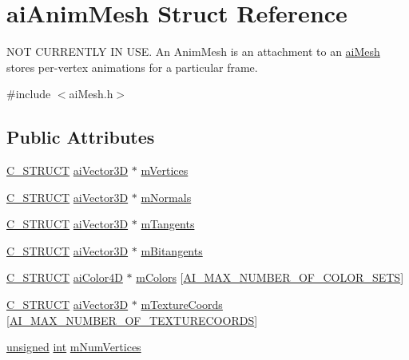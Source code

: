 \hypertarget{structai_anim_mesh}{\section{ai\-Anim\-Mesh Struct Reference}
\label{structai_anim_mesh}
}


N\-O\-T C\-U\-R\-R\-E\-N\-T\-L\-Y I\-N U\-S\-E. An Anim\-Mesh is an attachment to an \hyperlink{structai_mesh}{ai\-Mesh} stores per-\/vertex animations for a particular frame.  




{\ttfamily \#include $<$ai\-Mesh.\-h$>$}

\subsection*{Public Attributes}
\begin{DoxyCompactItemize}
\item 
\hyperlink{ai_defines_8h_ab51df4230ceb602bbc1bc109c432a6a0}{C\-\_\-\-S\-T\-R\-U\-C\-T} \hyperlink{structai_vector3_d}{ai\-Vector3\-D} $\ast$ \hyperlink{structai_anim_mesh_a0ac2dd4c1afd23e6a9293b1d0ded3060}{m\-Vertices}
\item 
\hyperlink{ai_defines_8h_ab51df4230ceb602bbc1bc109c432a6a0}{C\-\_\-\-S\-T\-R\-U\-C\-T} \hyperlink{structai_vector3_d}{ai\-Vector3\-D} $\ast$ \hyperlink{structai_anim_mesh_a64a07a8c5c419b1e006c5302bca4d334}{m\-Normals}
\item 
\hyperlink{ai_defines_8h_ab51df4230ceb602bbc1bc109c432a6a0}{C\-\_\-\-S\-T\-R\-U\-C\-T} \hyperlink{structai_vector3_d}{ai\-Vector3\-D} $\ast$ \hyperlink{structai_anim_mesh_a95dcc49c6d5ecc570ceb54552a0a9625}{m\-Tangents}
\item 
\hyperlink{ai_defines_8h_ab51df4230ceb602bbc1bc109c432a6a0}{C\-\_\-\-S\-T\-R\-U\-C\-T} \hyperlink{structai_vector3_d}{ai\-Vector3\-D} $\ast$ \hyperlink{structai_anim_mesh_a7d60acf4d2b4b59dcc6c88956bfae85f}{m\-Bitangents}
\item 
\hyperlink{ai_defines_8h_ab51df4230ceb602bbc1bc109c432a6a0}{C\-\_\-\-S\-T\-R\-U\-C\-T} \hyperlink{structai_color4_d}{ai\-Color4\-D} $\ast$ \hyperlink{structai_anim_mesh_a4f062d9fac71c6b367fdf0f8638e1ca5}{m\-Colors} \mbox{[}\hyperlink{ai_mesh_8h_a74ea1282873ac4b111b48d2380c26bdc}{A\-I\-\_\-\-M\-A\-X\-\_\-\-N\-U\-M\-B\-E\-R\-\_\-\-O\-F\-\_\-\-C\-O\-L\-O\-R\-\_\-\-S\-E\-T\-S}\mbox{]}
\item 
\hyperlink{ai_defines_8h_ab51df4230ceb602bbc1bc109c432a6a0}{C\-\_\-\-S\-T\-R\-U\-C\-T} \hyperlink{structai_vector3_d}{ai\-Vector3\-D} $\ast$ \hyperlink{structai_anim_mesh_ad24a0451adeb845a53eb2351b9462e0a}{m\-Texture\-Coords} \mbox{[}\hyperlink{ai_mesh_8h_a335874c5058c7f1e866eb953bf192258}{A\-I\-\_\-\-M\-A\-X\-\_\-\-N\-U\-M\-B\-E\-R\-\_\-\-O\-F\-\_\-\-T\-E\-X\-T\-U\-R\-E\-C\-O\-O\-R\-D\-S}\mbox{]}
\item 
\hyperlink{_free_image_8h_a425076c7067a1b5166e2cc530e914814}{unsigned} \hyperlink{wglew_8h_a500a82aecba06f4550f6849b8099ca21}{int} \hyperlink{structai_anim_mesh_a6bb0d45317a1bbea7f2b7f8191d0c436}{m\-Num\-Vertices}
\end{DoxyCompactItemize}


